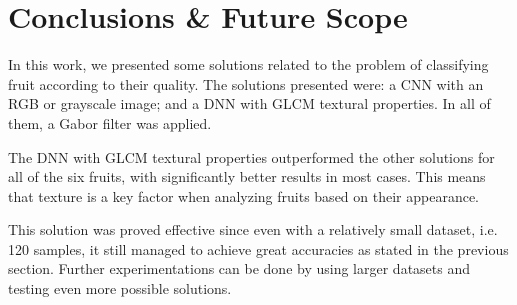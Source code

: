 \documentclass[../main.tex]{subfile}
\begin{document}
\section{Conclusions \& Future Scope} \label{sec:conclusions-&-future-scope}

In this work, we presented some solutions related to the problem of classifying fruit according to their quality. The solutions presented were: a CNN with an RGB or grayscale image; and a DNN with GLCM textural properties. In all of them, a Gabor filter was applied.

The DNN with GLCM textural properties outperformed the other solutions for all of the six fruits, with significantly better results in most cases. This means that texture is a key factor when analyzing fruits based on their appearance.

This solution was proved effective since even with a relatively small dataset, i.e. 120 samples, it still managed to achieve great accuracies as stated in the previous section. Further experimentations can be done by using larger datasets and testing even more possible solutions.
\end{document}
